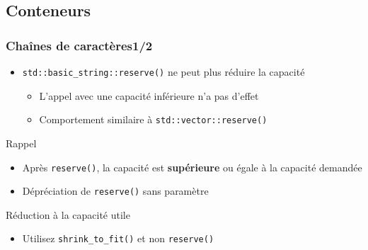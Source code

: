 \documentclass[C++.tex]{subfiles}
\begin{document}
\subsection*{Conteneurs}
\begin{frame}[fragile]
	\frametitle{Chaînes de caractères\titlehfill{}1/2}
	\begin{itemize}
		\item \lstinline|std::basic_string::reserve()| ne peut plus réduire la capacité
		\begin{itemize}
			\item L'appel avec une capacité inférieure n'a pas d'effet


			\item Comportement similaire à \lstinline|std::vector::reserve()|
		\end{itemize}
	\end{itemize}

	\begin{block}{Rappel}
		\begin{itemize}
			\item Après \lstinline|reserve()|, la capacité est \textbf{supérieure} ou égale à la capacité demandée
		\end{itemize}
	\end{block}

	\begin{itemize}
		\item Dépréciation de \lstinline|reserve()| sans paramètre
	\end{itemize}


	\begin{exampleblock}{Réduction à la capacité utile}
		\begin{itemize}
			\item Utilisez \lstinline|shrink_to_fit()| et non \lstinline|reserve()|
		\end{itemize}

	\end{exampleblock}
\end{frame}
\end{document}
